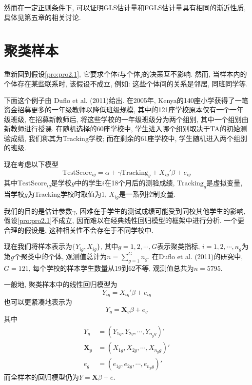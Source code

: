 \documentclass[cn, 12pt, math=mtpro2, bibstyle=apa, blue, twocol]{elegantbook}
\newcommand{\X}{\mathbold{X}}
\begin{document}
然而在一定正则条件下, 可以证明GLS估计量和FGLS估计量具有相同的渐近性质, 具体见第五章的相关讨论.

\section{聚类样本}
重新回到假设\ref{pro:pro2.1}, 它要求个体$i$与个体$j$的决策互不影响. 然而, 当样本内的个体存在某些联系时, 该假设不成立, 例如: 这些个体间的关系是邻居, 同班同学等.

下面这个例子由 Duflo et al. (2011)给出. 在2005年, Kenya的140座小学获得了一笔资金招募更多的一年级教师以降低班级规模, 其中的121座学校原本仅有一个一年级班级, 在招募新教师后, 将这些学校的一年级班级分为两个组别, 其中一个组别由新教师进行授课. 在随机选择的60座学校中, 学生进入哪个组别取决于TA的初始测验成绩, 我们称其为Tracking学校; 而在剩余的61座学校中, 学生随机进入两个组别的班级.

现在考虑以下模型
$$\text{TestScore}_{ig}=\alpha+\gamma\text{Tracking}_g+X_{ig}'\beta+e_{ig}$$
其中$\text{TestScore}_{ig}$是学校$g$中的学生$i$在18个月后的测验成绩, $\text{Tracking}_g$是虚拟变量, 当学校$g$为Tracking学校时取值为1, $X_{ig}$是一系列控制变量.

我们的目的是估计参数$\gamma$, 困难在于学生的测试成绩可能受到同校其他学生的影响, 假设\ref{pro:pro2.1}不成立, 因而难以在经典线性回归模型的框架中进行分析. 一个更合理的假设是, 这种相关性不会存在于不同学校中.

现在我们将样本表示为$\{Y_{ig},X_{ig}\}$, 其中$g=1,2,\cdots,G$表示聚类指标, $i=1,2,\cdots,n_g$为第$g$个聚类中的个体, 观测值总计为$n=\sum_{g=1}^{G}n_g$. 在Duflo et al. (2011)的研究中, $G=121$, 每个学校的样本学生数量从19到62不等, 观测值总共为$n=5795$.

一般地, 聚类样本中的线性回归模型为
$$Y_{ig}=X_{ig}'\beta+e_{ig}$$
也可以更紧凑地表示为
\begin{equation}\label{eq2.8}
  Y_g=\X_g\beta+e_g
\end{equation}
其中
\begin{align*}
Y_g&=(Y_{1g},Y_{2g},\cdots,Y_{n_gg})' \\
\X_g&=(X_{1g},X_{2g},\cdots,X_{n_gg})' \\
e_g&=(e_{1g},e_{2g},\cdots,e_{n_gg})'
\end{align*}
而全样本的回归模型仍为$Y=\X\beta+e$.
\end{document}
